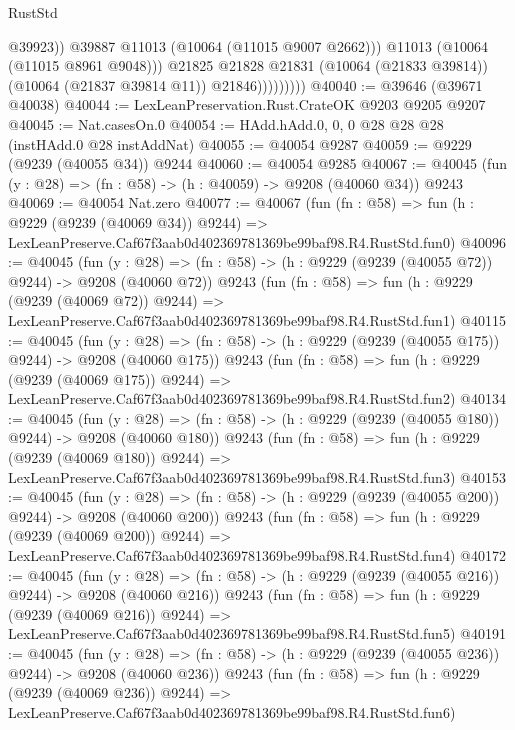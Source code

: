 \begin{lexlean}{RustStd}
\begin{coremodule}
                              @39923))
                          @39887
                          @11013
                          (@10064 (@11015 @9007 @2662)))
                        @11013
                        (@10064 (@11015 @8961 @9048)))
                      @21825
                      @21828
                      @21831
                      (@10064 (@21833 @39814))
                      (@10064 (@21837 @39814 @11))
                      @21846)))))))))
@40040 := @39646 (@39671 @40038)
@40044 := LexLeanPreservation.Rust.CrateOK @9203 @9205 @9207
@40045 := Nat.casesOn.{0}
@40054 := HAdd.hAdd.{0, 0, 0} @28 @28 @28 (instHAdd.{0} @28 instAddNat)
@40055 := @40054 @9287
@40059 := @9229 (@9239 (@40055 @34)) @9244
@40060 := @40054 @9285
@40067 := @40045 (fun (y : @28) => (fn : @58) -> (h : @40059) -> @9208 (@40060 @34)) @9243
@40069 := @40054 Nat.zero
@40077 := @40067
    (fun (fn : @58) =>
    fun (h : @9229 (@9239 (@40069 @34)) @9244) =>
    LexLeanPreserve.Caf67f3aab0d402369781369be99baf98.R4.RustStd.fun0)
@40096 := @40045
    (fun (y : @28) => (fn : @58) -> (h : @9229 (@9239 (@40055 @72)) @9244) -> @9208 (@40060 @72))
    @9243
    (fun (fn : @58) =>
    fun (h : @9229 (@9239 (@40069 @72)) @9244) =>
    LexLeanPreserve.Caf67f3aab0d402369781369be99baf98.R4.RustStd.fun1)
@40115 := @40045
    (fun (y : @28) => (fn : @58) -> (h : @9229 (@9239 (@40055 @175)) @9244) -> @9208 (@40060 @175))
    @9243
    (fun (fn : @58) =>
    fun (h : @9229 (@9239 (@40069 @175)) @9244) =>
    LexLeanPreserve.Caf67f3aab0d402369781369be99baf98.R4.RustStd.fun2)
@40134 := @40045
    (fun (y : @28) => (fn : @58) -> (h : @9229 (@9239 (@40055 @180)) @9244) -> @9208 (@40060 @180))
    @9243
    (fun (fn : @58) =>
    fun (h : @9229 (@9239 (@40069 @180)) @9244) =>
    LexLeanPreserve.Caf67f3aab0d402369781369be99baf98.R4.RustStd.fun3)
@40153 := @40045
    (fun (y : @28) => (fn : @58) -> (h : @9229 (@9239 (@40055 @200)) @9244) -> @9208 (@40060 @200))
    @9243
    (fun (fn : @58) =>
    fun (h : @9229 (@9239 (@40069 @200)) @9244) =>
    LexLeanPreserve.Caf67f3aab0d402369781369be99baf98.R4.RustStd.fun4)
@40172 := @40045
    (fun (y : @28) => (fn : @58) -> (h : @9229 (@9239 (@40055 @216)) @9244) -> @9208 (@40060 @216))
    @9243
    (fun (fn : @58) =>
    fun (h : @9229 (@9239 (@40069 @216)) @9244) =>
    LexLeanPreserve.Caf67f3aab0d402369781369be99baf98.R4.RustStd.fun5)
@40191 := @40045
    (fun (y : @28) => (fn : @58) -> (h : @9229 (@9239 (@40055 @236)) @9244) -> @9208 (@40060 @236))
    @9243
    (fun (fn : @58) =>
    fun (h : @9229 (@9239 (@40069 @236)) @9244) =>
    LexLeanPreserve.Caf67f3aab0d402369781369be99baf98.R4.RustStd.fun6)

\end{coremodule}
\end{lexlean}
